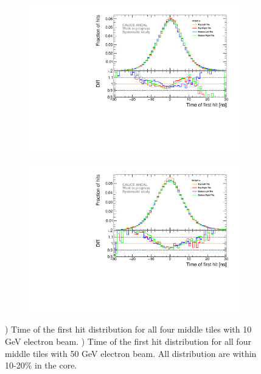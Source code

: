 \begin{figure}[htbp!]
	\begin{subfigure}[t]{0.5\textwidth}
		\centering
		\includegraphics[width=1\textwidth]{../Thesis_Plots/Timing/Electrons/Plots/Systematic_Inhomogeneity_10GeV.pdf}
		\caption{}\label{fig:timing_inhomo_10GeV}
	\end{subfigure}
	\hfill
	\begin{subfigure}[t]{0.5\textwidth}
		\centering
		\includegraphics[width=1\textwidth]{../Thesis_Plots/Timing/Electrons/Plots/Systematic_Inhomogeneity_50GeV.pdf}
		\caption{}\label{fig:timing_inhomo_50GeV}
	\end{subfigure}
	\caption{) Time of the first hit distribution for all four middle tiles with 10 GeV electron beam. ) Time of the first hit distribution for all four middle tiles with 50 GeV electron beam. All distribution are within 10-20\% in the core.}
\end{figure}

